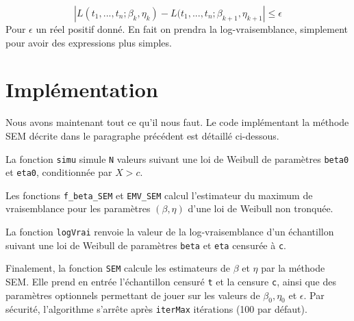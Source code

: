 \documentclass[a4paper]{report}
\begin{document}
\[ | L(t_1,...,t_n;\beta_k,\eta_k) - L(t_1,...,t_n;\beta_{k+1},\eta_{k+1} | \leq \epsilon \]
Pour $\epsilon$ un réel positif donné. En fait on prendra la log-vraisemblance, simplement pour
avoir des expressions plus simples.

\section{Implémentation}

Nous avons maintenant tout ce qu'il nous faut. Le code implémentant la méthode SEM décrite dans le paragraphe précédent est détaillé ci-dessous.

La fonction \verb|simu| simule \verb|N| valeurs suivant une loi de Weibull de paramètres \verb|beta0| et \verb|eta0|, conditionnée par $X>c$.



Les fonctions \verb|f_beta_SEM| et \verb|EMV_SEM| calcul l'estimateur du maximum de vraisemblance pour les paramètres $(\beta,\eta)$ d'une loi de Weibull non tronquée. 


La fonction \verb|logVrai| renvoie la valeur de la log-vraisemblance d'un échantillon suivant une loi de Weibull de paramètres \verb|beta| et \verb|eta| censurée à \verb|c|.


Finalement, la fonction \verb|SEM| calcule les estimateurs de $\beta$ et $\eta$ par la méthode SEM. Elle prend en entrée l'échantillon censuré \verb|t| et la censure \verb|c|, ainsi que des paramètres optionnels permettant de jouer sur les valeurs de $\beta_0, \eta_0$ et $\epsilon$. Par sécurité, l'algorithme s'arrête après \verb|iterMax| itérations (100 par défaut).
 
  


 
  
  
  
  
  
  
  




  
  
  
 
 
 
 
 
 
 
 
 
\end{document}

